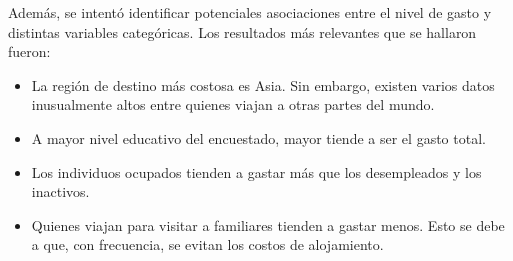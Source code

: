 \documentclass[
]{article}
\providecommand{\tightlist}{%
  \setlength{\itemsep}{0pt}\setlength{\parskip}{0pt}}
\begin{document}
Además, se intentó identificar potenciales asociaciones entre el nivel
de gasto y distintas variables categóricas. Los resultados más
relevantes que se hallaron fueron:

\begin{itemize}
\tightlist
\item
  La región de destino más costosa es Asia. Sin embargo, existen varios
  datos inusualmente altos entre quienes viajan a otras partes del
  mundo.
\item
  A mayor nivel educativo del encuestado, mayor tiende a ser el gasto
  total.
\item
  Los individuos ocupados tienden a gastar más que los desempleados y
  los inactivos.
\item
  Quienes viajan para visitar a familiares tienden a gastar menos. Esto
  se debe a que, con frecuencia, se evitan los costos de alojamiento.
\end{itemize}

\renewcommand\refname{Referencias \label{referencias}}
  
\end{document}
